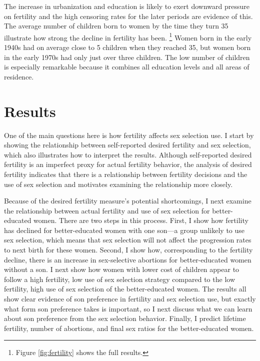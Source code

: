 \documentclass[12pt,letterpaper]{article}
\begin{document}
The increase in urbanization and education is likely to exert downward pressure
on fertility and the high censoring rates for the later periods are evidence of this.
The average number of children born to women by the time they turn 35 illustrate how
strong the decline in fertility has been.%
\footnote{
Figure \ref{fig:fertility} shows the full results.
}
Women born in the early 1940s had on average close to 5 children when 
they reached 35, but women born in the early 1970s had only just over three children.
The low number of children is especially remarkable because it combines
all education levels and all areas of residence.


\section{Results\label{sec:results}}

One of the main questions here is how fertility affects sex selection use.
I start by showing the relationship between self-reported desired fertility and sex 
selection, which also illustrates how to interpret the results.
Although self-reported desired fertility is an imperfect proxy for actual
fertility behavior, the analysis of desired fertility indicates that there is 
a relationship between fertility decisions and the use of sex selection and motivates 
examining the relationship more closely.

Because of the desired fertility measure's potential shortcomings, I next examine the 
relationship between actual fertility and use of sex selection for better-educated women.
There are two steps in this process.
First, I show how fertility has declined for better-educated women with one son---a group 
unlikely to use sex selection, which means that sex selection will not affect the 
progression rates to next birth for these women.
Second, I show how, corresponding to the fertility decline, there is an increase in
sex-selective abortions for better-educated women without a son.
I next show how women with lower cost of children appear to follow a high fertility, low
use of sex selection strategy compared to the low fertility, high use of sex selection of
the better-educated women.
The results all show clear evidence of son preference in fertility and sex selection use, 
but exactly what form son preference takes is important, so I next discuss what we can
learn about son preference from the sex selection behavior.
Finally, I predict lifetime fertility, number of abortions, and final sex ratios for
the better-educated women.
\end{document}
